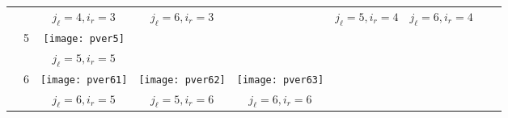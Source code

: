 \documentclass[12pt]{article}
\theoremstyle{definition}
\theoremstyle{remark}
\begin{document}
\begin{table}
{\begin{tabular}{ r|c|c|c|c|c|c|c|c| }
\cline{3-7}
&  & $j_{\ell}=4,i_r=3$ & $j_{\ell}=6,i_r=3$ &  & $j_{\ell}=5,i_r=4$ & $j_{\ell}=6,i_r=4$   \\
\cline{2-7}
& 5 & \begin{minipage}{.20\textwidth}\vspace{2mm}
	\texttt{[image: pver5]}\vspace{2mm}
\end{minipage} &  &  &  &  \\
\cline{3-7}
&  & $j_{\ell}=5,i_r=5$  &  &  &  &  \\

\cline{2-7}
& 6 & \begin{minipage}{.20\textwidth}\vspace{2mm}
	\texttt{[image: pver61]}\vspace{2mm}
\end{minipage} & \begin{minipage}{.20\textwidth}
\texttt{[image: pver62]}
\end{minipage} & \begin{minipage}{.20\textwidth}
\texttt{[image: pver63]}
\end{minipage} &  &    \\
\cline{3-7}
&  & $j_{\ell}=6,i_r=5$ & $j_{\ell}=5,i_r=6$ & $j_{\ell}=6,i_r=6$ &  &    \\
\cline{2-7}
\end{tabular}
}\label{pver0-6}
\end{table}
\end{document}
